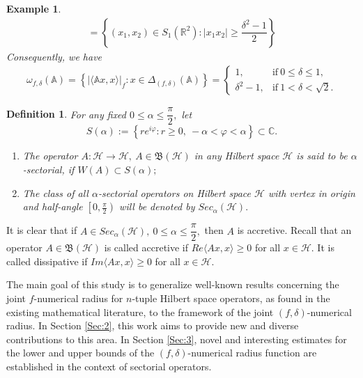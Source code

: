 \documentclass[12pt]{article}
\newtheorem{definition}{Definition}
\newtheorem{example}{Example}
\begin{document}
\begin{example}
\begin{multline*}
 =  \left\lbrace (x_{1},x_{2})\in S_{1}(\mathbb{R}^{2}) : \vert x_{1}x_{2}\vert \geq \dfrac{\delta^{2}-1}{2}   \right\rbrace \nonumber
\end{multline*}
Consequently, we have
\begin{eqnarray}
\omega_{f,\delta}(\mathbb{A})  =  \left\lbrace \vert  \langle  \mathbb{A} x,x\rangle\vert_{f}: x\in \Delta_{(f,\delta)}(\mathbb{A}) \right\rbrace
 =  \begin{cases}
1, & \text{if} \ 0 \leq \delta \leq 1, \\
\delta^{2}-1, &  \text{if} \ 1 < \delta <\sqrt{2}.  \nonumber
\end{cases}
\end{eqnarray}
\end{example}
\begin{definition}
\label{def7}
For any fixed $ 0\leq \alpha \leq \dfrac{\pi}{2}, $ let \[ S(\alpha):=\left\lbrace re^{i\varphi}: r\geq 0, \ -\alpha < \varphi <\alpha \right\rbrace \subset \mathbb{C}. \]
\begin{enumerate}[label=\upshape{\arabic*.}, ref=\upshape{\arabic*}, labelindent=5pt, leftmargin=*]
\item The operator $ A:\mathcal{H}\rightarrow \mathcal{H}, \ A\in \mathfrak{B}(\mathcal{H})  $ in any Hilbert space $ \mathcal{H} $ is said to be $ \alpha$-sectorial, if $ W(A)\subset S(\alpha); $
\item The class of all $ \alpha$-sectorial operators on Hilbert space $ \mathcal{H} $ with vertex in origin and half-angle $ \left[ 0,\frac{\pi}{2}\right)  $ will be denoted by $ Sec_{\alpha}(\mathcal{H}).$
\end{enumerate}
\end{definition}
It is clear that if $ A\in Sec_{\alpha}(\mathcal{H}), \ 0\leq \alpha \leq \dfrac{\pi}{2},$ then $ A $ is accretive.
Recall that an operator $ A\in \mathfrak{B}(\mathcal{H}) $
is called accretive if $ Re \langle Ax, x \rangle \geq 0  $ for all $ x\in\mathcal{H}.$
It is called dissipative if $ Im \langle Ax, x \rangle \geq 0  $ for all $ x\in\mathcal{H}$.

The main goal of this study is to generalize well-known results concerning the joint $ f$-numerical radius for $n$-tuple Hilbert space operators, as found in the existing mathematical literature, to the framework of the joint $(f,\delta)$-numerical radius. In Section \ref{Sec:2}, this work aims to provide new and diverse contributions to this area. In Section \ref{Sec:3}, novel and interesting estimates for the lower and upper bounds of the $(f,\delta)$-numerical radius function are established in the context of sectorial operators.
\end{document}
